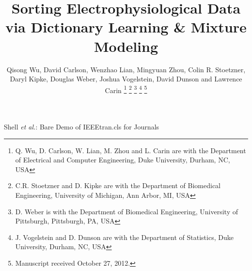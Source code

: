 \documentclass[journal]{IEEEtran}
\begin{document}
%
\title{Sorting Electrophysiological Data via Dictionary Learning \& Mixture Modeling}%
%
%

\author{Qisong Wu, David Carlson, Wenzhao Lian, Mingyuan Zhou, Colin R. Stoetzner, Daryl Kipke, Douglas Weber, Joshua Vogelstein, David Dunson and Lawrence Carin%
\thanks{Q. Wu, D. Carlson, W. Lian, M. Zhou and L. Carin are with the Department
of Electrical and Computer Engineering, Duke University, Durham, NC, USA}%
\thanks{C.R. Stoetzner and D. Kipke are with the Department of Biomedical Engineering, University of Michigan, Ann Arbor, MI, USA}%
\thanks{D. Weber is with the Department of Biomedical Engineering, University of Pittsburgh, Pittsburgh, PA, USA}%
\thanks{J. Vogelstein and D. Dunson are with the Department of Statistics, Duke University, Durham, NC, USA}
\thanks{Manuscript received October 27, 2012.}}

% 
%



%
{Shell \MakeLowercase{\textit{et al.}}: Bare Demo of IEEEtran.cls for Journals}
% 
\end{document}
